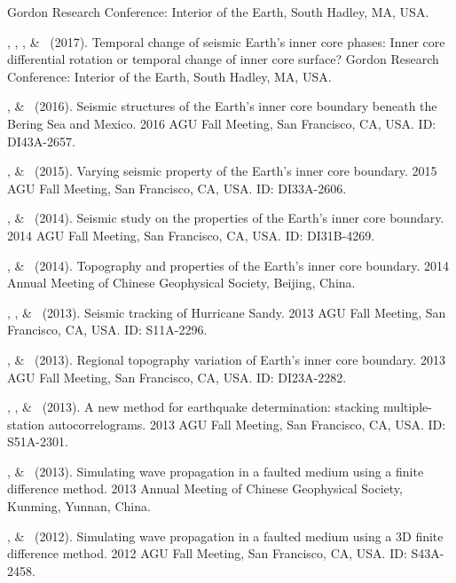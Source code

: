 \begin{etaremune}
    Gordon Research Conference: Interior of the Earth, South Hadley, MA, USA.
\item
    \JYao, \Me, \LSun, \& \LWen\ (2017).
    Temporal change of seismic Earth's inner core phases: Inner core differential rotation or temporal change of inner core surface?
    Gordon Research Conference: Interior of the Earth, South Hadley, MA, USA.
\item
    \Me, \& \LWen\ (2016).
    Seismic structures of the Earth's inner core boundary beneath the Bering Sea and Mexico.
    2016 AGU Fall Meeting, San Francisco, CA, USA. ID: DI43A-2657.
\item
    \Me, \& \LWen\ (2015).
    Varying seismic property of the Earth's inner core boundary.
    2015 AGU Fall Meeting, San Francisco, CA, USA. ID: DI33A-2606.
\item
    \Me, \& \LWen\ (2014).
    Seismic study on the properties of the Earth's inner core boundary.
    2014 AGU Fall Meeting, San Francisco, CA, USA. ID: DI31B-4269.
\item
    \Me, \& \LWen\ (2014).
    Topography and properties of the Earth's inner core boundary.
    2014 Annual Meeting of Chinese Geophysical Society, Beijing, China.
\item
    \XChen, \Me, \& \LWen\ (2013).
    Seismic tracking of Hurricane Sandy.
    2013 AGU Fall Meeting, San Francisco, CA, USA. ID: S11A-2296.
\item
    \Me, \& \LWen\ (2013).
    Regional topography variation of Earth's inner core boundary.
    2013 AGU Fall Meeting, San Francisco, CA, USA. ID: DI23A-2282.
\item
    \MZhang, \Me, \& \LWen\ (2013).
    A new method for earthquake determination: stacking multiple-station autocorrelograms.
    2013 AGU Fall Meeting, San Francisco, CA, USA. ID: S51A-2301.
\item
    \Me, \& \LWen\ (2013).
    Simulating wave propagation in a faulted medium using a finite difference method.
    2013 Annual Meeting of Chinese Geophysical Society, Kunming, Yunnan, China.
\item
    \Me, \& \LWen\ (2012).
    Simulating wave propagation in a faulted medium using a 3D finite difference method.
    2012 AGU Fall Meeting, San Francisco, CA, USA. ID: S43A-2458.
\end{etaremune}
